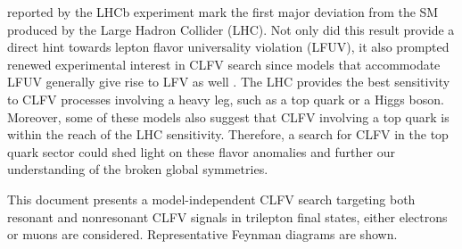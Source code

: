 reported by the LHCb experiment mark the first major deviation from the SM produced by the Large Hadron Collider (LHC). Not only did this result provide a direct hint towards lepton flavor universality violation (LFUV), it also prompted renewed experimental interest in CLFV search since models that accommodate LFUV generally give rise to LFV as well \cite{Glashow:2014iga}. The LHC provides the best sensitivity to CLFV processes involving a heavy leg, such as a top quark or a Higgs boson. Moreover, some of these models \cite{Kim:2018oih} also suggest that CLFV involving a top quark is within the reach of the LHC sensitivity. Therefore, a search for CLFV in the top quark sector could shed light on these flavor anomalies and further our understanding of the broken global symmetries.

This document presents a model-independent CLFV search targeting both resonant and nonresonant CLFV signals in trilepton final states, either electrons or muons are considered. Representative Feynman diagrams are shown.




